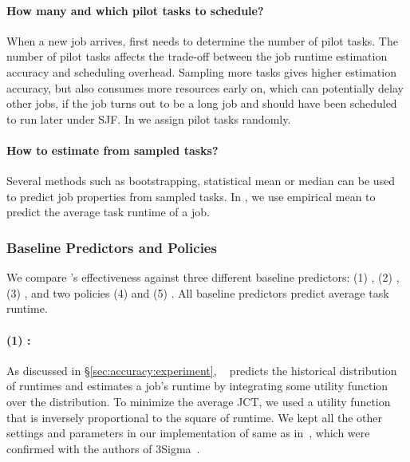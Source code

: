 \paragraph{How many and which pilot tasks to schedule?}
When a new job arrives, \name first needs to determine the number of
pilot tasks.  The number of pilot tasks affects the trade-off between
the job runtime estimation accuracy and scheduling overhead.  Sampling
more tasks gives higher estimation accuracy, 
but also consumes more resources early on, which can potentially delay other
jobs, if the job turns out to be a long job and should have been scheduled to
run later under SJF. 
In \slearn we assign pilot tasks randomly.


\paragraph{How to estimate from sampled tasks?}  Several methods such
as bootstrapping, statistical mean or median can be used to predict job
properties from sampled tasks.  In \gs, we use empirical mean to
predict the average task runtime of a job.  

\subsubsection{Baseline Predictors and Policies}
\label{sec:design:baselines}

We compare \slearn's effectiveness against three different baseline predictors:
(1) \primarybasepredict,  (2) \pointestimator , (3) \oracle , and two policies (4) \las
and (5) \fifo. All baseline  predictors predict average task runtime.

\paragraph{(1) \primarybasepredict: } 
As discussed in \S\ref{sec:accuracy:experiment},
\primarybasepredict~\cite{3Sigma} 
predicts the historical distribution of runtimes 
and estimates a job's runtime by integrating some utility function over the distribution.
To minimize the average JCT, we used a utility function that is inversely
proportional to the square of runtime.  We kept all the other settings
and parameters in our implementation of \primarybasepredict same 
as in~\cite{3Sigma}, which were confirmed with the authors of
3Sigma~\cite{personalCommunication:JunWoo}.


